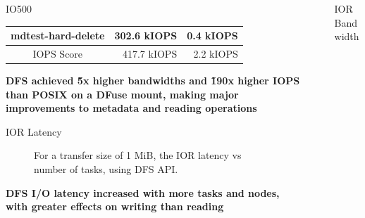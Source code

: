 \documentclass[final]{beamer}
\newlength{\sepwidth}
\newlength{\colwidth}
\newcommand{\separatorcolumn}{\begin{column}{\sepwidth}\end{column}}
\begin{document}
\begin{frame}[t, fragile]
\begin{columns}[t]
\begin{column}{\colwidth}
\begin{block}{IO500}
\begin{minipage}[t]{0.48\colwidth}
{\begin{tabular}{|c|r|r|}
        mdtest-hard-delete & 302.6 kIOPS & 0.4 kIOPS \\
        \hline
        IOPS Score & 417.7 kIOPS  & 2.2 kIOPS \\
        \hline
      \end{tabular}
      }
    \end{minipage}
    \par\medskip
    {{\normalsize{\textbf{DFS achieved \~5x higher bandwidths and \~190x higher IOPS than POSIX on a DFuse mount, making major improvements to metadata and reading operations}}}}
    
  \end{block}

  \begin{block}{IOR Latency}
    \begin{figure} 
      \centering 
       
      \caption{For a transfer size of 1 MiB, the IOR latency vs number of tasks, using DFS API.}
    \label{fig:ior_latency}
    \end{figure}
    {{\normalsize{\textbf{DFS I/O latency increased with more tasks and nodes, with greater effects on writing than reading}}}}
  \end{block}
 

\end{column}

\separatorcolumn

\begin{column}{\colwidth}

  \begin{block}{IOR Bandwidth}


\end{block}
\end{column}
\end{columns}
\end{frame}
\end{document}
